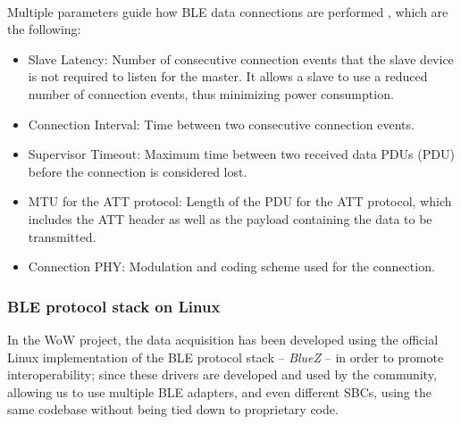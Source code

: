 \paragraph{} Multiple parameters guide how \acs{BLE} data connections are performed \cite{Specification1999}, which are the following: 
\begin{itemize}
    \item Slave Latency: Number of consecutive connection events that the slave device is not required to listen for the master. It allows a slave to use a reduced number of connection events, thus minimizing power consumption.
    \item Connection Interval: Time between two consecutive connection events.
    \item Supervisor Timeout: Maximum time between two received data \acl{PDU}s (\acs{PDU}) before the connection is considered lost.
    \item \acf{MTU} for the \acs{ATT} protocol: Length of the \acs{PDU} for the \acs{ATT} protocol, which includes the \acs{ATT} header as well as the payload containing the data to be transmitted.
    \item Connection \acs{PHY}: Modulation and coding scheme used for the connection.
\end{itemize}

\subsubsection{\acs{BLE} protocol stack on Linux} 

In the \acs{WoW} project, the data acquisition has been developed using the official Linux implementation of the \acs{BLE} protocol stack \cite{BlueZ} -- \textit{BlueZ} -- in order to promote interoperability; since these drivers are developed and used by the community, allowing us to use multiple \acs{BLE} adapters, and even different \acs{SBC}s, using the same codebase without being tied down to proprietary code. 




